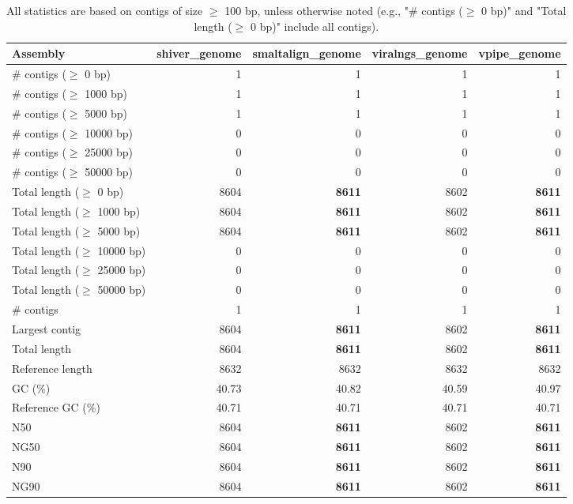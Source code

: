 \documentclass[12pt,a4paper]{article}
\begin{document}
\begin{table}[ht]
\begin{center}
\caption{All statistics are based on contigs of size $\geq$ 100 bp, unless otherwise noted (e.g., "\# contigs ($\geq$ 0 bp)" and "Total length ($\geq$ 0 bp)" include all contigs).}
\begin{tabular}{|l*{4}{|r}|}
\hline
Assembly & shiver\_genome & smaltalign\_genome & viralngs\_genome & vpipe\_genome \\ \hline
\# contigs ($\geq$ 0 bp) & 1 & 1 & 1 & 1 \\ \hline
\# contigs ($\geq$ 1000 bp) & 1 & 1 & 1 & 1 \\ \hline
\# contigs ($\geq$ 5000 bp) & 1 & 1 & 1 & 1 \\ \hline
\# contigs ($\geq$ 10000 bp) & 0 & 0 & 0 & 0 \\ \hline
\# contigs ($\geq$ 25000 bp) & 0 & 0 & 0 & 0 \\ \hline
\# contigs ($\geq$ 50000 bp) & 0 & 0 & 0 & 0 \\ \hline
Total length ($\geq$ 0 bp) & 8604 & {\bf 8611} & 8602 & {\bf 8611} \\ \hline
Total length ($\geq$ 1000 bp) & 8604 & {\bf 8611} & 8602 & {\bf 8611} \\ \hline
Total length ($\geq$ 5000 bp) & 8604 & {\bf 8611} & 8602 & {\bf 8611} \\ \hline
Total length ($\geq$ 10000 bp) & 0 & 0 & 0 & 0 \\ \hline
Total length ($\geq$ 25000 bp) & 0 & 0 & 0 & 0 \\ \hline
Total length ($\geq$ 50000 bp) & 0 & 0 & 0 & 0 \\ \hline
\# contigs & 1 & 1 & 1 & 1 \\ \hline
Largest contig & 8604 & {\bf 8611} & 8602 & {\bf 8611} \\ \hline
Total length & 8604 & {\bf 8611} & 8602 & {\bf 8611} \\ \hline
Reference length & 8632 & 8632 & 8632 & 8632 \\ \hline
GC (\%) & 40.73 & 40.82 & 40.59 & 40.97 \\ \hline
Reference GC (\%) & 40.71 & 40.71 & 40.71 & 40.71 \\ \hline
N50 & 8604 & {\bf 8611} & 8602 & {\bf 8611} \\ \hline
NG50 & 8604 & {\bf 8611} & 8602 & {\bf 8611} \\ \hline
N90 & 8604 & {\bf 8611} & 8602 & {\bf 8611} \\ \hline
NG90 & 8604 & {\bf 8611} & 8602 & {\bf 8611} \\ \hline

\end{tabular}
\end{center}
\end{table}
\end{document}
